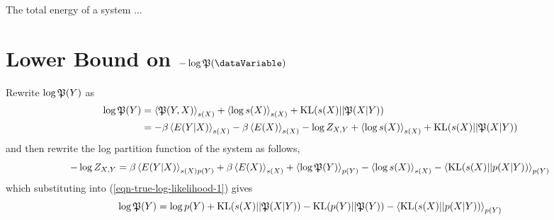 \documentclass[]{article}
\begin{document}
The total energy of a system ...

\section{Lower Bound on $-\log \trueProb(\dataVariable)$} \label{sec-upper-bound-log-prob}

Rewrite $\log \mathfrak{P}(Y)$ as
\begin{align}
    \log \mathfrak{P}(Y) & =
    \left\langle \mathfrak{P}(Y,
      X) \right\rangle_{s(X )} + \left\langle \log
      s(X) \right\rangle_{s(X)} +
    \text{KL}(s(X)||\mathfrak{P}(X|Y))
    \nonumber \\ & = -\beta\left\langle  E(Y |
      X) \right\rangle_{s(X)}
    -\beta\left\langle E(X) \right\rangle_{s(X)} -
    \log Z_{X,Y} + \left\langle \log
      s(X) \right\rangle_{s(X)} +
    \text{KL}(s(X)||\mathfrak{P}(X|Y)) \label{eqn-true-log-likelihood-1}
\end{align}
and then rewrite the log partition function of the system as follows,
\[
- \log Z_{X,Y} =
\beta\left\langle E(Y |
  X) \right\rangle_{s(X)p(Y)}
+ \beta\left\langle E(X) \right\rangle_{s(X )} +
\left\langle \log \mathfrak{P}(Y) \right\rangle_{p(Y)}
-\left\langle \log s(X) \right\rangle_{s(X)} -
\left\langle \text{KL}(s(X) ||
  p(X |
  Y)) \right\rangle_{p(Y)}
\]
which substituting into (\ref{eqn-true-log-likelihood-1}) gives
\[
\log \mathfrak{P}(Y) = \log p(Y) +
\text{KL}(s(X)||\mathfrak{P}(X|Y))
- \text{KL}(p(Y) || \mathfrak{P}(Y))
- \left\langle \text{KL}(s(X) ||
  p(X |
  Y)) \right\rangle_{p(Y)}
\]
\end{document}

